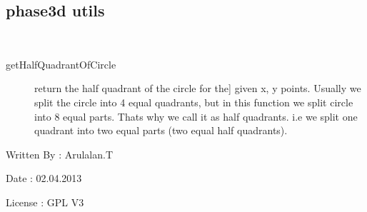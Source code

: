 \documentclass[letterpaper,10pt,english]{sphinxmanual}
\begin{document}
\subsection{phase3d utils}
\label{mjo:module-trig}\label{mjo:phase3d-utils}

\begin{fulllineitems}
\label{mjo:trig.getHalfQuadrantOfCircle}~\begin{description}
\item[{getHalfQuadrantOfCircle}] \leavevmode{[}return the half quadrant of the circle for the{]}
given x, y points. Usually we split the circle into 4 equal quadrants,
but in this function we split circle into 8 equal parts. Thats why
we call it as half quadrants. i.e we split one quadrant into two equal
parts (two equal half quadrants).

\end{description}

Written By : Arulalan.T

Date : 02.04.2013

License : GPL V3

\end{fulllineitems}

\label{mjo:module-phase3d}\label{mjo:module-phase3d}
\end{document}
